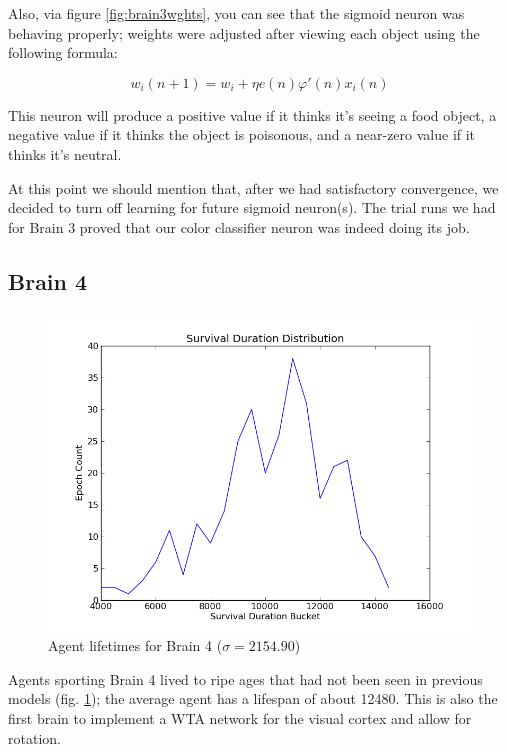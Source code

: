 Also, via figure \ref{fig:brain3wghts}, you can see that the sigmoid neuron 
was behaving properly; weights were
adjusted after viewing each object using the following formula\cite{Haykin}:

\begin{equation}
  w_i(n+1) = w_i + \eta e(n) \varphi'(n) x_i(n)
\end{equation}

This neuron will produce a positive value if it thinks it's seeing a food 
object, a negative value if it thinks the object is poisonous, and a near-zero
value if it thinks it's neutral.

At this point we should mention that, after we had satisfactory 
convergence, we decided to turn off learning for future sigmoid neuron(s). The 
trial runs we had for Brain 3 proved that our color
classifier neuron was indeed doing its job.


\subsection{Brain 4}

\begin{figure}
\begin{center}
  \includegraphics[scale=.65]{plots/brain4hist.png}
  \caption{Agent lifetimes for Brain 4 ($\sigma = 2154.90$)}
  \label{fig:brain4his}
\end{center}
\end{figure}

Agents sporting Brain 4 lived to ripe ages that had not been seen in previous
models (fig. \ref{fig:brain4his}); the average agent has a lifespan of about
12480. This is also the first brain 
to implement a WTA network for the visual cortex and allow for rotation.


